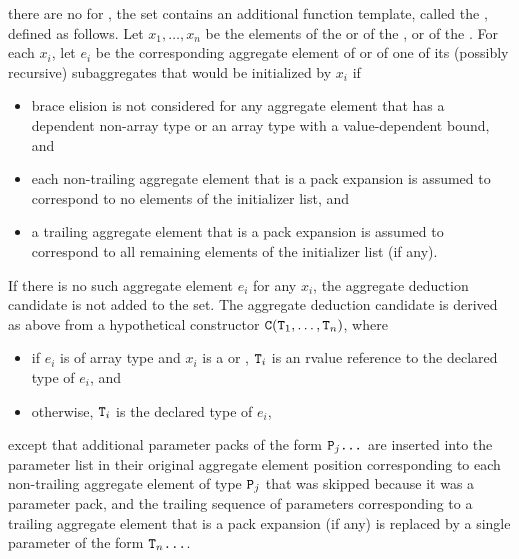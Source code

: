 there are no  for ,
the set contains an additional function template,
called the , defined as follows.
Let $x_1, \dotsc, x_n$ be the elements
of the  or
of the , or
of the .
For each $x_i$, let $e_i$ be the corresponding aggregate element
of  or of one of its (possibly recursive) subaggregates
that would be initialized by $x_i$ if
\begin{itemize}
\item
brace elision is not considered for any aggregate element
that has a dependent non-array type or
an array type with a value-dependent bound, and
\item
each non-trailing aggregate element that is a pack expansion
is assumed to correspond to no elements of the initializer list, and
\item
a trailing aggregate element that is a pack expansion is assumed to correspond
to all remaining elements of the initializer list (if any).
\end{itemize}
If there is no such aggregate element $e_i$ for any $x_i$,
the aggregate deduction candidate is not added to the set.
The aggregate deduction candidate is derived as above
from a hypothetical constructor $\texttt{C}(\texttt{T}_1, \dotsc, \texttt{T}_n)$,
where
\begin{itemize}
\item
if $e_i$ is of array type and
$x_i$ is a  or ,
$\texttt{T}_i$ is an rvalue reference to the declared type of $e_i$, and
\item
otherwise, $\texttt{T}_i$ is the declared type of $e_i$,
\end{itemize}
except that additional parameter packs of the form $\texttt{P}_j \texttt{...}$
are inserted into the parameter list in their original aggregate element position corresponding to each non-trailing aggregate element of type $\texttt{P}_j$
that was skipped because it was a parameter pack, and
the trailing sequence of parameters corresponding
to a trailing aggregate element that is a pack expansion (if any)
is replaced by a single parameter of the form $\texttt{T}_n \texttt{...}$.

